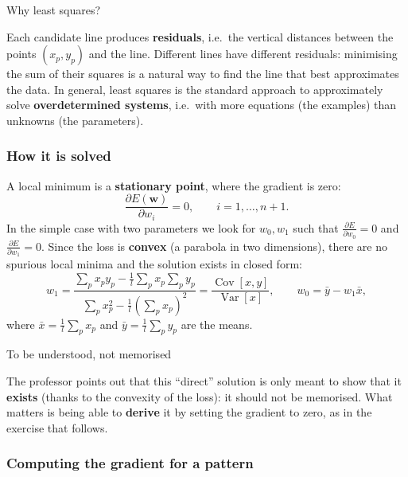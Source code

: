 \begin{boxtip}{Why least squares?}

Each candidate line produces \textbf{residuals}, i.e.\ the vertical
distances between the points \((x_p, y_p)\) and the line. Different
lines have different residuals: minimising the sum of their squares is
a natural way to find the line that best approximates the data. In
general, least squares is the standard approach to approximately solve
\textbf{overdetermined systems}, i.e.\ with more equations (the
examples) than unknowns (the parameters).

\end{boxtip}

\subsubsection{How it is solved}\label{come-si-risolve}

A local minimum is a \textbf{stationary point}, where the gradient is
zero: \[
\frac{\partial E(\mathbf{w})}{\partial w_i} = 0, \qquad i = 1, \dots, n+1.
\] In the simple case with two parameters we look for \(w_0, w_1\) such
that \(\frac{\partial E}{\partial w_0} = 0\) and
\(\frac{\partial E}{\partial w_1} = 0\). Since the loss is
\textbf{convex} (a parabola in two dimensions), there are no spurious
local minima and the solution exists in closed form: \[
w_1 = \frac{\sum_p x_p y_p - \frac{1}{l}\sum_p x_p \sum_p y_p}{\sum_p x_p^2 - \frac{1}{l}\left(\sum_p x_p\right)^2} = \frac{\operatorname{Cov}[x,y]}{\operatorname{Var}[x]}, \qquad w_0 = \bar{y} - w_1 \bar{x},
\] where \(\bar{x} = \frac{1}{l}\sum_p x_p\) and
\(\bar{y} = \frac{1}{l}\sum_p y_p\) are the means.

\begin{boxtip}{To be understood, not memorised}

The professor points out that this ``direct'' solution is only meant to
show that it \textbf{exists} (thanks to the convexity of the loss): it
should not be memorised. What matters is being able to
\textbf{derive} it by setting the gradient to zero, as in the exercise
that follows.

\end{boxtip}

\subsubsection{Computing the gradient for a
pattern}\label{calcolo-del-gradiente-per-un-pattern}

